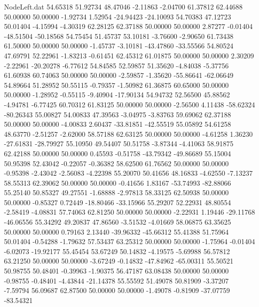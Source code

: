 \begin{filecontents}{NodeLeft.dat}
  54.65318   51.92734   48.47046    -2.11863   -2.04700   61.37812   62.44688   50.00000   50.00000   -1.92734    1.52954  -24.94423  -24.10093
  54.70383   47.12723   50.01404    -4.15994   -4.30319   62.28125   62.37188   50.00000   50.00000    2.87277   -0.01404  -48.51504  -50.18568
  54.75454   51.45737   53.10181    -3.76600   -2.90650   61.73438   61.50000   50.00000   50.00000   -1.45737   -3.10181  -43.47860  -33.55566
  54.80524   47.69791   52.22961    -1.83213   -0.61451   62.45312   61.01875   50.00000   50.00000    2.30209   -2.22961  -20.20278   -6.77612
  54.84585   52.59857   51.35620    -4.84038   -5.37756   61.60938   60.74063   50.00000   50.00000   -2.59857   -1.35620  -55.86641  -62.06649
  54.89664   51.28952   50.55115    -0.79357   -1.50982   61.36875   60.65000   50.00000   50.00000   -1.28952   -0.55115   -9.40904  -17.90134
  54.94732   52.56500   45.88562    -4.94781   -6.77425   60.70312   61.83125   50.00000   50.00000   -2.56500    4.11438  -58.62324  -80.26343
  55.00827   54.00833   47.39563    -3.04975   -3.83763   59.69062   62.37188   50.00000   50.00000   -4.00833    2.60437  -33.81851  -42.55519
  55.05892   54.61258   48.63770    -2.51257   -2.62000   58.57188   62.63125   50.00000   50.00000   -4.61258    1.36230  -27.61831  -28.79927
  55.10950   49.54407   50.51758    -3.87344   -4.41063   58.91875   62.42188   50.00000   50.00000    0.45593   -0.51758  -43.79342  -49.86689
  55.15004   50.95398   52.43042    -0.22057   -0.36382   58.62500   61.76562   50.00000   50.00000   -0.95398   -2.43042   -2.56083   -4.22398
  55.20070   50.41656   48.16833    -4.62550   -7.13237   58.55313   62.39062   50.00000   50.00000   -0.41656    1.83167  -53.74993  -82.88066
  55.25140   50.85327   49.27551    -1.68888   -2.97813   58.33125   62.50938   50.00000   50.00000   -0.85327    0.72449  -18.80466  -33.15966
  55.29207   52.22931   48.80554    -2.58419   -4.08831   57.74063   62.81250   50.00000   50.00000   -2.22931    1.19446  -29.11768  -46.06556
  55.34292   49.20837   47.86560    -3.51532   -4.01669   58.06875   63.35625   50.00000   50.00000    0.79163    2.13440  -39.96332  -45.66312
  55.41388   51.75964   50.01404    -0.54288   -1.79632   57.53437   63.25312   50.00000   50.00000   -1.75964   -0.01404   -6.02073  -19.92177
  55.45454   53.67249   50.14832    -4.19575   -5.69988   56.57812   63.21250   50.00000   50.00000   -3.67249   -0.14832  -47.84962  -65.00311
  55.50521   50.98755   50.48401    -0.39963   -1.90375   56.47187   63.08438   50.00000   50.00000   -0.98755   -0.48401   -4.43844  -21.14378
  55.55592   51.49078   50.81909    -3.37207   -7.59794   56.09687   62.87500   50.00000   50.00000   -1.49078   -0.81909  -37.07759  -83.54321

\end{filecontents}
